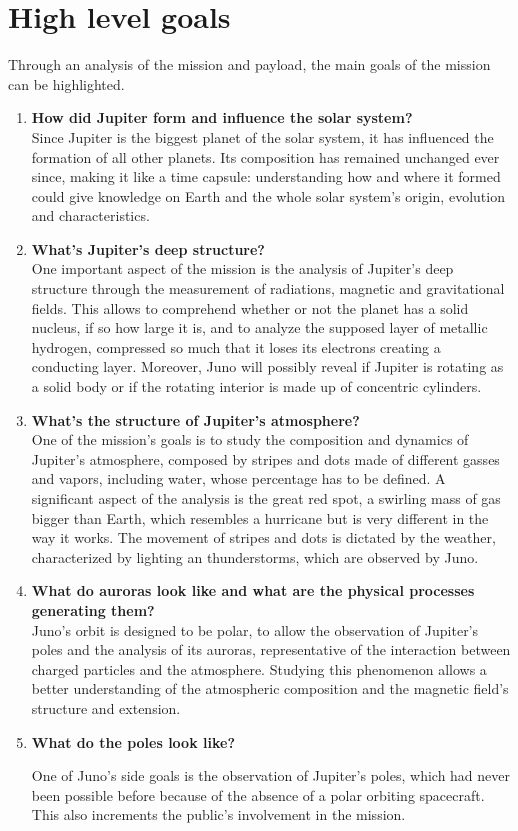 \section{High level goals}
\label{sec:goals}

Through an analysis of the mission and payload, the main goals of the mission can be highlighted. 

\begin{enumerate}
    \item \textbf{How did Jupiter form and influence the solar system? }\\ %
    Since Jupiter is the biggest planet of the solar system, it has influenced the formation of all other planets. Its composition has remained unchanged ever since, making it like a time capsule: understanding how and where it formed could give knowledge on Earth and the whole solar system’s origin, evolution and characteristics. 
    \item \textbf{What's Jupiter's deep structure?}\\
    One important aspect of the mission is the analysis of Jupiter's deep structure through the measurement of radiations, magnetic and gravitational fields. This allows to comprehend whether or not the planet has a solid nucleus, if so how large it is, and to analyze the supposed layer of metallic hydrogen, compressed so much that it loses its electrons creating a conducting layer.  Moreover, Juno will possibly reveal if Jupiter is rotating as a solid body or if the rotating interior is made up of concentric cylinders. %
    \item \textbf{What's the structure of Jupiter's atmosphere?}\\ %
    One of the mission's goals is to study the composition and dynamics of Jupiter's atmosphere, composed by stripes and dots made of different gasses and vapors, including water, whose percentage has to be defined. A significant aspect of the analysis is the great red spot, a swirling mass of gas bigger than Earth, which resembles a hurricane but is very different in the way it works. The movement of stripes and dots is dictated by the weather, characterized by lighting an thunderstorms, which are observed by Juno.
    \item \textbf{What do auroras look like and what are the physical processes generating them?}\\ %
    Juno's orbit is designed to be polar, to allow the observation of Jupiter's poles and the analysis of its auroras, representative of the interaction between charged particles and the atmosphere. Studying this phenomenon allows a better understanding of the atmospheric composition and the magnetic field's structure and extension.
    \item \textbf{What do the poles look like?} %

    \label{goal 5}
    One of Juno's side goals is the observation of Jupiter's poles, which had never been possible before because of the absence of a polar orbiting spacecraft. This also increments the public's involvement in the mission.

\end{enumerate}